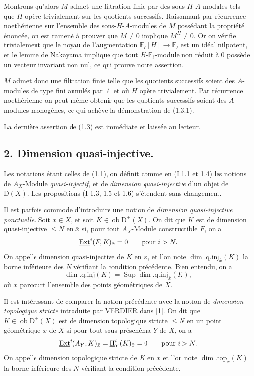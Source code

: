 \documentclass[11pt]{article}
\providecommand{\uH}{\underline{\mathrm H}}
\DeclareMathOperator{\Ext}{Ext}
\newcommand{\D}{\mathrm{D}}
\newcommand{\F}{\mathbb{F}}
\newcommand{\ob}{\operatorname{ob}}
\providecommand{\ob}{\operatorname{ob}}
\begin{document}
Montrons qu'alors $M$ admet une filtration finie par des sous-$H$-$A$-modules tels que $H$ opère trivialement sur les quotients successifs. Raisonnant par récurrence noethérienne sur l'ensemble des sous-$H$-$A$-modules de $M$ possédant la propriété énoncée, on est ramené à prouver que $M\neq0$ implique $M^H\neq0$. Or on vérifie trivialement que le noyau de l'augmentation $\F_\ell[H]\to\F_\ell$ est un idéal nilpotent, et le lemme de Nakayama implique que tout $H$-$\F_\ell$-module non réduit à $0$ possède un vecteur invariant non nul, ce qui prouve notre assertion.

$M$ admet donc une filtration finie telle que les quotients successifs soient des $A$-modules de type fini annulés par $\ell$ et où $H$ opère trivialement. Par récurrence noethérienne on peut même obtenir que les quotients successifs soient des $A$-modules monogènes, ce qui achève la démonstration de (1.3.1).

La dernière assertion de (1.3) est immédiate et laissée au lecteur.

\subsection*{2. Dimension quasi-injective.}

Les notations étant celles de (1.1), on définit comme en (I 1.1 et 1.4) les notions de $A_X$-Module \emph{quasi-injectif}, et de \emph{dimension quasi-injective} d'un objet de $\D(X)$. Les propositions (I 1.3, 1.5 et 1.6) s'étendent sans changement.

Il est parfois commode d'introduire une notion de \emph{dimension quasi-injective ponctuelle}. Soit $x\in X$, et soit $K\in\ob \D^+(X)$. On dit que $K$ est de dimension quasi-injective $\leq N$ en $\bar{x}$ si, pour tout $A_X$-Module constructible $F$, on a
\[
        \underline{\Ext}^{i}(F,K)_{\bar{x}}=0\qquad\hbox{pour }i>N.
\]
On appelle dimension quasi-injective de $K$ en $\bar{x}$, et l'on note $\dim.\mathrm{q.inj}_{\bar{x}}(K)$ la borne inférieure des $N$ vérifiant la condition précédente. Bien entendu, on a
\[
        \dim.\mathrm{q.inj}(K)=\operatorname{Sup}\dim.\mathrm{q.inj}_{\bar{x}}(K),
\]
où $\bar{x}$ parcourt l'ensemble des points géométriques de $X$.

Il est intéressant de comparer la notion précédente avec la notion de \emph{dimension topologique stricte} introduite par VERDIER dans [1]. On dit que $K\in\ob \D^+(X)$ est de dimension topologique stricte $\leq N$ en un point géométrique $\bar{x}$ de $X$ si pour tout sous-préschéma $Y$ de $X$, on a
\[
        \underline{\Ext}^{i}(A_Y,K)_{\bar{x}}=\uH^i_Y(K)_{\bar{x}}=0\qquad\hbox{pour }i>N.
\]
On appelle dimension topologique stricte de $K$ en $\bar{x}$ et l'on note $\dim.\mathrm{top}_{\bar{x}}(K)$ la borne inférieure des $N$ vérifiant la condition précédente.
\end{document}
